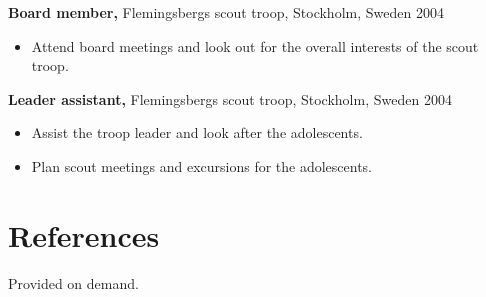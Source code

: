 \documentclass[margin]{res}
\begin{document}
\begin{resume}
{\bf Board member,} Flemingsbergs scout troop, Stockholm, Sweden \hfill 2004
\begin{itemize} \itemsep -2pt
\item Attend board meetings and look out for the overall interests of the scout troop.
\end{itemize}
{\bf Leader assistant,} Flemingsbergs scout troop, Stockholm, Sweden \hfill 2004
\begin{itemize} \itemsep -2pt
\item Assist the troop leader and look after the adolescents.
\item Plan scout meetings and excursions for the adolescents.
\end{itemize}

\section{References}
Provided on demand.

\end{resume}
\end{document}
